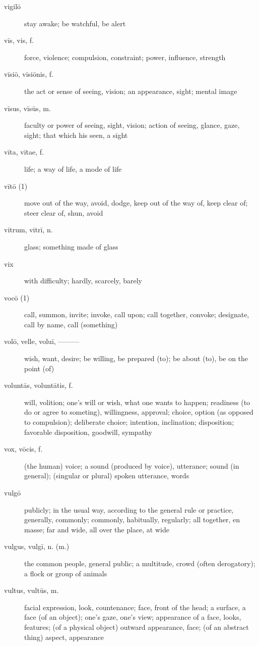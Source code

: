 \begin{description}
    \item[vigilō] stay awake; be watchful, be alert
    \item[vīs, vis, f.] force, violence; compulsion, constraint; power, influence, strength
    \item[vīsiō, vīsiōnis, f.] the act or sense of seeing, vision; an appearance, sight; mental image
    \item[vīsus, vīsūs, m.] faculty or power of seeing, sight, vision; action of seeing, glance, gaze, sight; that which his seen, a sight
    \item[vīta, vītae, f.] life; a way of life, a mode of life
    \item[vītō (1)] move out of the way, avoid, dodge, keep out of the way of, keep clear of; steer clear of, shun, avoid
    \item[vitrum, vitrī, n.] glass; something made of glass
    \item[vix] with difficulty; hardly, scarcely, barely
    \item[vocō (1)] call, summon, invite; invoke, call upon; call together, convoke; designate, call by name, call (something)
    \item[volō, velle, voluī, ———] wish, want, desire; be willing, be prepared (to); be about (to), be on the point (of)
    \item[voluntās, voluntātis, f.] will, volition; one's will or wish, what one wants to happen; readiness (to do or agree to someting), willingness, approval; choice, option (as opposed to compulsion); deliberate choice; intention, inclination; disposition; favorable disposition, goodwill, sympathy
    \item[vox, vōcis, f.] (the human) voice; a sound (produced by voice), utterance; sound (in general); (singular or plural) spoken utterance, words
    \item[vulgō] publicly; in the usual way, according to the general rule or practice, generally, commonly; commonly, habitually, regularly; all together, en masse; far and wide, all over the place, at wide
    \item[vulgus, vulgī, n. (m.)] the common people, general public; a multitude, crowd (often derogatory); a flock or group of animals
    \item[vultus, vultūs, m.] facial expression, look, countenance; face, front of the head; a surface, a face (of an object); one's gaze, one's view; appearance of a face, looks, features; (of a physical object) outward appearance, face; (of an abstract thing) aspect, appearance
\end{description}
